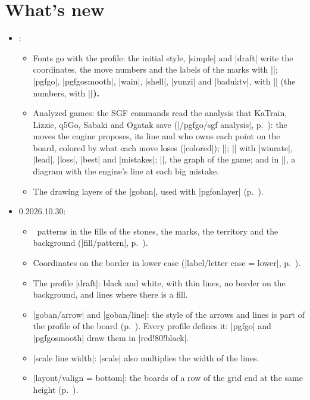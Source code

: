 \section{What's new}
\label{sec:novedades}


\begin{itemize}
	\item \pgfgoversion:
		\begin{itemize}
			\item Fonts go with the profile: the initial style, |simple| and |draft| write the coordinates, the move numbers and the labels of the marks with |\normalfont|; |pgfgo|, |pgfgosmooth|, |wain|, |shell|, |yunzi| and |baduktv|, with |\sffamily| (the numbers, with |\sffamily\bfseries|).
			\item Analyzed games: the SGF commands read the analysis that KaTrain, Lizzie, q5Go, Sabaki and Ogatak save (|/pgfgo/sgf analysis|, p.~\pageref{subsec:sgfanalisis}): the moves the engine proposes, its line and who owns each point on the board, colored by what each move loses (|colored|); |\pgfgocandidates|; |\sgfinfo| with |winrate|, |lead|, |loss|, |best| and |mistakes|; |\sgfgraph|, the graph of the game; and in |\sgfdiagrams|, a diagram with the engine's line at each big mistake.
			\item The drawing layers of the |goban|, used with |pgfonlayer| (p.~\pageref{subsec:capas}).
		\end{itemize}
	\item 0.2026.10.30:
		\begin{itemize}
			\item \tikzname\ patterns in the fills of the stones, the marks, the territory and the background (|fill/pattern|, p.~\pageref{sec:piedras}).
			\item Coordinates on the border in lower case (|label/letter case = lower|, p.~\pageref{subsec:etiquetas}).
			\item The profile |draft|: black and white, with thin lines, no border on the background, and lines where there is a fill.
			\item |goban/arrow| and |goban/line|: the style of the arrows and lines is part of the profile of the board (p.~\pageref{subsec:flechas}). Every profile defines it: |pgfgo| and |pgfgosmooth| draw them in |red!80!black|.
			\item |scale line width|: |scale| also multiplies the width of the lines.
			\item |layout/valign = bottom|: the boards of a row of the grid end at the same height (p.~\pageref{subsec:disposicion}).

\end{itemize}
\end{itemize}

